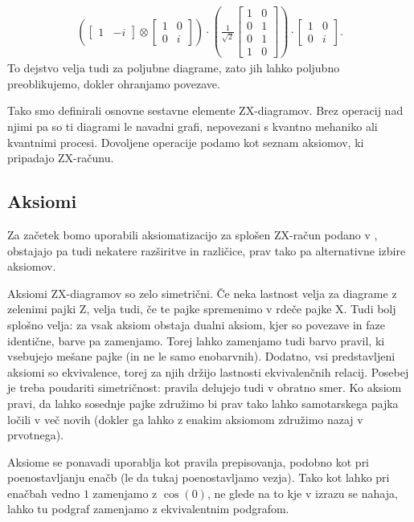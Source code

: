 \documentclass[mat1]{fmfdelo}
\begin{document}
\begin{align*}
    \left(\begin{bmatrix}
        1&-i
    \end{bmatrix}\otimes\begin{bmatrix}
        1&0\\0&i
    \end{bmatrix}\right)\cdot \left(\frac{1}{\sqrt2}\begin{bmatrix}
        1&0\\
        0&1\\
        0&1\\
        1&0
    \end{bmatrix}\right) \cdot \begin{bmatrix}
        1&0\\0&i
    \end{bmatrix}.
\end{align*}
To dejstvo velja tudi za poljubne diagrame, zato jih lahko poljubno preoblikujemo, dokler ohranjamo povezave.

Tako smo definirali osnovne sestavne elemente ZX-diagramov. Brez operacij nad njimi pa so ti diagrami le navadni grafi, nepovezani s kvantno mehaniko ali kvantnimi procesi. Dovoljene operacije podamo kot seznam aksiomov, ki pripadajo ZX-računu.
\subsection{Aksiomi}
Za začetek bomo uporabili aksiomatizacijo za splošen ZX-račun podano v \cite[poglavje 2.2]{vilmart}, obstajajo pa tudi nekatere razširitve in različice, prav tako pa alternativne izbire aksiomov.

Aksiomi ZX-diagramov so zelo simetrični. Če neka lastnost velja za diagrame z zelenimi pajki Z, velja tudi, če te pajke spremenimo v rdeče pajke X. Tudi bolj splošno velja: za vsak aksiom obstaja dualni aksiom, kjer so povezave in faze identične, barve pa zamenjamo. Torej lahko zamenjamo tudi barvo pravil, ki vsebujejo mešane pajke (in ne le samo enobarvnih). Dodatno, vsi predstavljeni aksiomi so ekvivalence, torej za njih držijo lastnosti ekvivalenčnih relacij. Posebej je treba poudariti simetričnost: pravila delujejo tudi v obratno smer. Ko aksiom pravi, da lahko sosednje pajke združimo bi prav tako lahko samotarskega pajka ločili v več novih (dokler ga lahko z enakim aksiomom združimo nazaj v prvotnega).

Aksiome se ponavadi uporablja kot pravila prepisovanja, podobno kot pri poenostavljanju enačb (le da tukaj poenostavljamo vezja). Tako kot lahko pri enačbah vedno \(1\) zamenjamo z \(\cos(0)\), ne glede na to kje v izrazu se nahaja, lahko tu podgraf zamenjamo z ekvivalentnim podgrafom.
\end{document}
